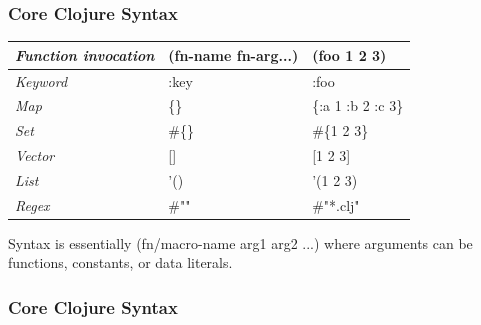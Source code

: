 \documentclass{beamer}
\begin{document}

% 
\begin{frame}
  \frametitle{Core Clojure Syntax}
  \begin{tabularx}{\textwidth}{ |X|X|X| }
    \hline
    \emph{Function invocation} & (fn-name fn-arg...)  &  (foo 1 2 3) \\ 
    \hline
    \emph{Keyword} & :key  & :foo \\ 
    \hline
    \emph{Map} &    \{\}  & \{:a 1 :b 2 :c 3\} \\ 
    \hline
    \emph{Set} &    \#\{\} & \#\{1 2 3\} \\ 
    \hline
    \emph{Vector} & []  & [1 2 3] \\
    \hline
    \emph{List} & '() & '(1 2 3) \\
    \hline
    \emph{Regex} & \#"" & \#"*.clj" \\    
    \hline
  \end{tabularx}

  \vspace{.5cm}
  Syntax is essentially (fn/macro-name arg1 arg2 ...) where arguments can
  be functions, constants, or data literals. 
\end{frame}

\begin{frame}[fragile]
  \frametitle{Core Clojure Syntax}
\end{frame}
\end{document}
